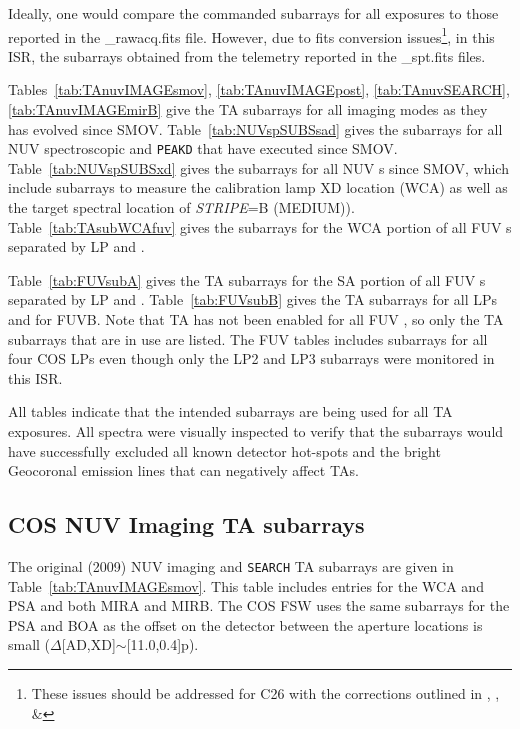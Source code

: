 Ideally, one would compare the commanded subarrays for all exposures to those reported in the {\sf \_rawacq.fits} file.
However, due to fits conversion issues\footnote{These issues should be addressed for C26 with the corrections outlined in , , \& },
in this ISR, the subarrays obtained from the telemetry reported in the {\sf \_spt.fits} files.

Tables~\ref{tab:TAnuvIMAGEsmov}, \ref{tab:TAnuvIMAGEpost}, \ref{tab:TAnuvSEARCH}, \ref{tab:TAnuvIMAGEmirB} give the TA subarrays for all imaging modes
as they has evolved since SMOV.
Table~\ref{tab:NUVspSUBSsad} gives the subarrays for all NUV spectroscopic  and \texttt{PEAKD} that have executed since SMOV.
Table~\ref{tab:NUVspSUBSxd} gives the subarrays for all NUV s since SMOV, which include subarrays to measure the
calibration lamp XD location (WCA) as well as the target spectral location of \textit{STRIPE}=B (MEDIUM)).
Table~\ref{tab:TAsubWCAfuv} gives the subarrays for the WCA portion of all FUV s separated by LP and \cenwave{}.

Table~\ref{tab:FUVsubA} gives the TA subarrays for the SA portion of all FUV \tacq{}s separated by LP and \cenwave{}.
Table~\ref{tab:FUVsubB} gives the TA subarrays for all LPs and \cenwaves{} for FUVB.
Note that TA has not been enabled for all FUV \cenwaves{}, so only the TA subarrays that are in use are listed.
The FUV tables includes subarrays for all four COS LPs even though only the LP2 and LP3 subarrays were monitored in this ISR.

All tables indicate that the intended subarrays are being used for all TA exposures. All spectra were visually
inspected to verify that the subarrays would have successfully excluded all known detector hot-spots and the
bright Geocoronal emission lines that can negatively affect TAs.

\subsection{COS NUV Imaging TA subarrays}\label{subsec:NUVimSUBS}
The original (2009) NUV imaging  and \texttt{SEARCH} TA subarrays are given in Table~\ref{tab:TAnuvIMAGEsmov}.
This table includes entries for the WCA and PSA and both MIRA and MIRB.
The COS FSW uses the same subarrays for the PSA and BOA as the offset on the detector between the aperture locations is small ($\Delta$[AD,XD]$\sim$[11.0,0.4]p).

